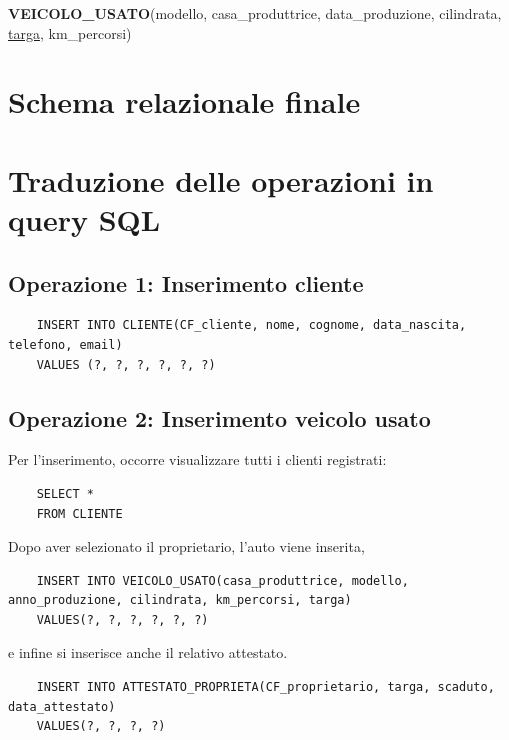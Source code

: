 \documentclass[a4paper,12pt]{report}
\begin{document}
\noindent
\textbf{VEICOLO\_USATO}(modello, casa\_produttrice, data\_produzione, cilindrata, \underline{targa}, km\_percorsi)\\

\section{Schema relazionale finale}

\section{Traduzione delle operazioni in query SQL}

\subsection*{Operazione 1: Inserimento cliente}
\begin{lstlisting}
	INSERT INTO CLIENTE(CF_cliente, nome, cognome, data_nascita, telefono, email) 
	VALUES (?, ?, ?, ?, ?, ?)
\end{lstlisting}

\subsection*{Operazione 2: Inserimento veicolo usato}
Per l'inserimento, occorre visualizzare tutti i clienti registrati:
\begin{lstlisting}
	SELECT * 
	FROM CLIENTE
\end{lstlisting}
Dopo aver selezionato il proprietario, l'auto viene inserita,
\begin{lstlisting}
	INSERT INTO VEICOLO_USATO(casa_produttrice, modello, anno_produzione, cilindrata, km_percorsi, targa) 
	VALUES(?, ?, ?, ?, ?, ?)
\end{lstlisting}
e infine si inserisce anche il relativo attestato.
\begin{lstlisting}
	INSERT INTO ATTESTATO_PROPRIETA(CF_proprietario, targa, scaduto, data_attestato) 
	VALUES(?, ?, ?, ?)
\end{lstlisting}
\end{document}
